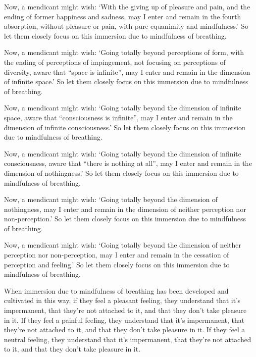 \documentclass[12pt,openany]{book}%
\begin{document}
Now, a mendicant might wish: ‘With the giving up of pleasure and pain, and the ending of former happiness and sadness, may I enter and remain in the fourth absorption, without pleasure or pain, with pure equanimity and mindfulness.’ So let them closely focus on this immersion due to mindfulness of breathing. 

Now, a mendicant might wish: ‘Going totally beyond perceptions of form, with the ending of perceptions of impingement, not focusing on perceptions of diversity, aware that “space is infinite”, may I enter and remain in the dimension of infinite space.’ So let them closely focus on this immersion due to mindfulness of breathing. 

Now, a mendicant might wish: ‘Going totally beyond the dimension of infinite space, aware that “consciousness is infinite”, may I enter and remain in the dimension of infinite consciousness.’ So let them closely focus on this immersion due to mindfulness of breathing. 

Now, a mendicant might wish: ‘Going totally beyond the dimension of infinite consciousness, aware that “there is nothing at all”, may I enter and remain in the dimension of nothingness.’ So let them closely focus on this immersion due to mindfulness of breathing. 

Now, a mendicant might wish: ‘Going totally beyond the dimension of nothingness, may I enter and remain in the dimension of neither perception nor non-perception.’ So let them closely focus on this immersion due to mindfulness of breathing. 

Now, a mendicant might wish: ‘Going totally beyond the dimension of neither perception nor non-perception, may I enter and remain in the cessation of perception and feeling.’ So let them closely focus on this immersion due to mindfulness of breathing. 

When immersion due to mindfulness of breathing has been developed and cultivated in this way, if they feel a pleasant feeling, they understand that it’s impermanent, that they’re not attached to it, and that they don’t take pleasure in it. If they feel a painful feeling, they understand that it’s impermanent, that they’re not attached to it, and that they don’t take pleasure in it. If they feel a neutral feeling, they understand that it’s impermanent, that they’re not attached to it, and that they don’t take pleasure in it. 
\end{document}
